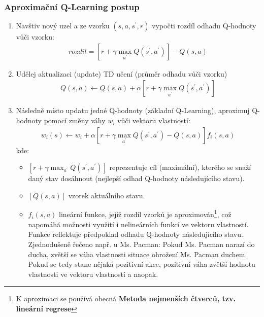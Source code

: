 \subsubsection{Aproximační Q-Learning postup}
\label{teorie:approxq}
\begin{enumerate}
  \item Navštiv nový uzel a ze vzorku $(s,a,s^\prime,r)$ vypočti rozdíl odhadu Q-hodnoty vůči vzorku:
    \begin{align}
	\label{rov:approxq1}
     rozdil = \left [ r + \gamma \max_{a^\prime}Q(s^\prime,a^\prime) \right]  - Q(s,a) 
    \end{align}
  \item Udělej aktualizaci (update) TD učení (průměr odhadu vůči vzorku)
    \begin{align}
	\label{rov:approxq2}
     Q(s,a) \leftarrow  Q(s,a) + \alpha \left [ r + \gamma \max_{a^\prime}Q(s^\prime,a^\prime) \right]
    \end{align}
  \item Následně místo updatu jedné Q-hodnoty (základní Q-Learning), aproximuj Q-hodnoty pomocí změny váhy $w_i$ vůči vektoru vlastností:
    \begin{align}
	\label{rov:approxq3}
    w_i(s) \leftarrow w_i + \alpha \left [ r + \gamma \max_{a^\prime}Q(s^\prime,a^\prime) - Q(s,a) \right] f_i(s,a)
    \end{align}
    kde:
    \begin{itemize}
      \item $\left [ r + \gamma \max_{a^\prime}Q(s^\prime,a^\prime)\right] $ reprezentuje cíl (maximální), kterého se snaží daný stav dosáhnout (nejlepší odhad Q-hodnoty následujícího stavu).
      \item $\left [ Q(s,a)\right]$ vzorek aktuálního stavu.
      \item $f_i(s,a)$ lineární funkce, jejíž rozdíl vzorků je aproximován\footnote{K aproximaci se používá obecná \textbf{Metoda nejmenších čtverců, tzv. lineární regrese}}, což napomáhá možnosti využití i nelineárních funkcí ve vektoru vlastností. Funkce reflektuje předpoklad odhadu Q-hodnoty následujícího stavu.\newline
      Zjednodušeně řečeno např. u Ms. Pacman: Pokud Ms. Pacman narazí do ducha, zvětší se váha vlastnosti situace ohrožení Ms. Pacman duchem. Pokud se tedy stane nějaká pozitivní akce, pozitivní váha zvětší hodnotu vlastnosti ve vektoru vlastností a naopak.
    \end{itemize}

\end{enumerate}

